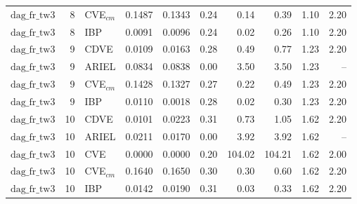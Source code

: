 \begin{table}[ht]
\begin{tabular}{lrlrrrrrrr}
$\text{dag\_fr\_tw3}$ & 8 & CVE$_{cm}$ & 0.1487 & 0.1343 & 0.24 & 0.14 & 0.39 & 1.10 & 2.20 \\
$\text{dag\_fr\_tw3}$ & 8 & IBP & 0.0091 & 0.0096 & 0.24 & 0.02 & 0.26 & 1.10 & 2.20 \\
\hline
$\text{dag\_fr\_tw3}$ & 9 & CDVE & 0.0109 & 0.0163 & 0.28 & 0.49 & 0.77 & 1.23 & 2.20 \\
$\text{dag\_fr\_tw3}$ & 9 & ARIEL & 0.0834 & 0.0838 & 0.00 & 3.50 & 3.50 & 1.23 & -- \\
$\text{dag\_fr\_tw3}$ & 9 & CVE$_{cm}$ & 0.1428 & 0.1327 & 0.27 & 0.22 & 0.49 & 1.23 & 2.20 \\
$\text{dag\_fr\_tw3}$ & 9 & IBP & 0.0110 & 0.0018 & 0.28 & 0.02 & 0.30 & 1.23 & 2.20 \\
\hline
$\text{dag\_fr\_tw3}$ & 10 & CDVE & 0.0101 & 0.0223 & 0.31 & 0.73 & 1.05 & 1.62 & 2.20 \\
$\text{dag\_fr\_tw3}$ & 10 & ARIEL & 0.0211 & 0.0170 & 0.00 & 3.92 & 3.92 & 1.62 & -- \\
$\text{dag\_fr\_tw3}$ & 10 & CVE & 0.0000 & 0.0000 & 0.20 & 104.02 & 104.21 & 1.62 & 2.00 \\
$\text{dag\_fr\_tw3}$ & 10 & CVE$_{cm}$ & 0.1640 & 0.1650 & 0.30 & 0.30 & 0.60 & 1.62 & 2.20 \\
$\text{dag\_fr\_tw3}$ & 10 & IBP & 0.0142 & 0.0190 & 0.31 & 0.03 & 0.33 & 1.62 & 2.20 \\
\bottomrule
\end{tabular}
\end{table}

